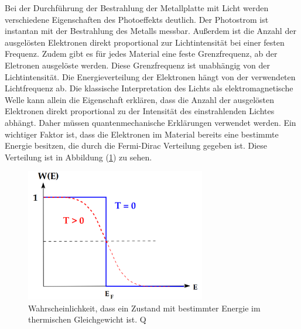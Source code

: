 Bei der Durchführung der Bestrahlung der Metallplatte mit Licht werden 
verschiedene Eigenschaften des Photoeffekts deutlich. 
Der Photostrom ist instantan mit der Bestrahlung des Metalls messbar.
Außerdem ist die Anzahl der ausgelösten Elektronen direkt proportional zur Lichtintensität 
bei einer festen Frequenz.
Zudem gibt es für jedes Material eine feste Grenzfrequenz, ab der Eletronen ausgelöste 
werden. Diese Grenzfrequenz ist unabhängig von der Lichtintensität. 
Die Energieverteilung der Elektronen hängt von der verwendeten Lichtfrequenz ab. 
Die klassische Interpretation des Lichts als elektromagnetische Welle 
kann allein die Eigenschaft erklären, dass die Anzahl der ausgelösten
Elektronen direkt proportional zu der Intensität des einstrahlenden 
Lichtes abhängt. Daher müssen quantenmechanische Erklärungen verwendet werden. 
Ein wichtiger Faktor ist, dass die Elektronen im Material bereits eine 
bestimmte Energie besitzen, die durch die Fermi-Dirac Verteilung gegeben ist. 
Diese Verteilung ist in Abbildung (\ref{fig:Fermi_Dirac}) zu sehen. 
\begin{figure}[H]
    \centering
    \includegraphics[width=0.7\textwidth]{content/Bilder/Fermi_Dirac.png}
    \caption{Wahrscheinlichkeit, dass ein Zustand mit bestimmter Energie im thermischen Gleichgewicht ist. Q\cite{anleitungV500}}
    \label{fig:Fermi_Dirac}
  \end{figure}
